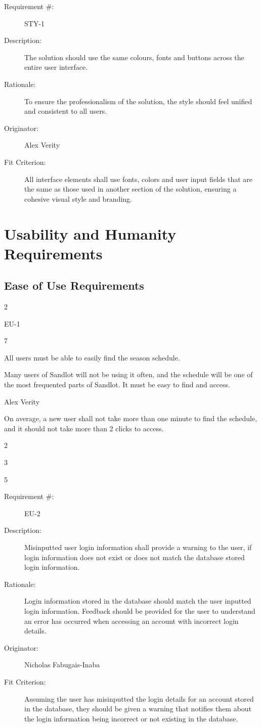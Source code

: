 \documentclass[12pt]{article}
\newenvironment{myreq}[1]{%
\setlist[description]{font=\normalfont\color{darkgray}}%
\begin{tcolorbox}[colframe=black,colback=white, sharp corners, boxrule=1pt]%
\bfseries\color{blue}%
\begin{description}#1}%
{\end{description}\end{tcolorbox}}
\newcommand{\twoinline}[2]{\begin{multicols}{2}#1 #2\end{multicols}}
\newcommand{\reqno}{\item[Requirement \#:]}
\newcommand{\reqevent}{\item[Event/BUC/PUC \#:]}
\newcommand{\reqdesc}{\item[Description:]}
\newcommand{\reqrat}{\item[Rationale:]}
\newcommand{\reqorig}{\item[Originator:]}
\newcommand{\reqfit}{\item[Fit Criterion:]}
\newcommand{\reqsatis}{\item[Customer Satisfaction:]}
\newcommand{\reqdissat}{\item[Customer Dissatisfaction:]}
\begin{document}
\begin{myreq}
  \reqno STY-1
  \reqdesc The solution should use the same colours, fonts and buttons across
  the entire user interface.
  \reqrat To ensure the professionalism of the solution, the style should
  feel unified and consistent to all users.
  \reqorig Alex Verity
  \reqfit All interface elements shall use fonts, colors and user input fields
  that are the same as those used in another section of the solution, ensuring
  a cohesive visual style and branding.
  \twoinline
    {\reqsatis 2}
    {\reqdissat 2}
\end{myreq}

\section{Usability and Humanity Requirements}
\subsection{Ease of Use Requirements}

\begin{myreq}
  \twoinline
    {\reqno EU-1}
    {\reqevent 7}
  \reqdesc All users must be able to easily find the season schedule.
  \reqrat Many users of Sandlot will not be using it often, and the
  schedule will be one of the most frequented parts of Sandlot. It must be
  easy to find and access. 
  \reqorig Alex Verity
  \reqfit On average, a new user shall not take more than one minute to find
  the schedule, and it should not take more than 2 clicks to access.
  \twoinline
    {\reqsatis 3}
    {\reqdissat 5}
\end{myreq}

\begin{myreq}
  \reqno EU-2
  \reqdesc Misinputted user login information shall provide a warning to the
  user, if login information does not exist or does not match the database
  stored login information.
  \reqrat Login information stored in the database should match the user
  inputted login information. Feedback should be provided for the user to
  understand an error has occurred when accessing an account with incorrect
  login details.
  \reqorig Nicholas Fabugais-Inaba
  \reqfit Assuming the user has misinputted the login details for
  an account stored in the database, they should be given a warning that
  notifies them about the login information being incorrect or not existing
  in the database.
  \twoinline
    {\reqsatis 3}
    {\reqdissat 5}
\end{myreq}
\end{document}
